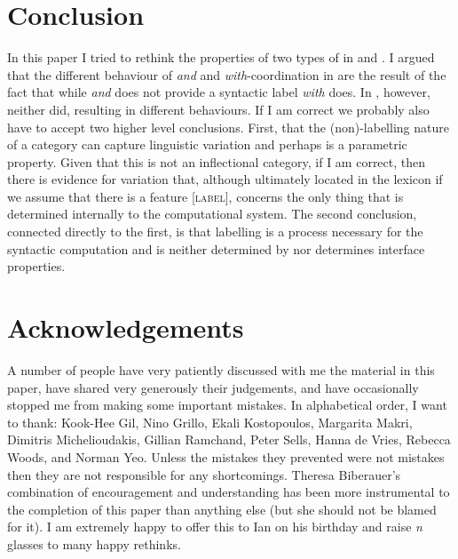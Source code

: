 \documentclass[output=paper]{langsci/langscibook}
\begin{document}
\section{Conclusion}

In this paper I tried to rethink the properties of two types of
 in  and . I argued that the
different behaviour of \emph{and} and \emph{with}-coor\-di\-na\-tion in
 are the result of the fact that while \emph{and} does not provide
a syntactic label \emph{with} does. In , however, neither did,
resulting in different behaviours. If I am correct we probably also have to
accept two higher level conclusions. First, that the (non)-labelling nature of
a category can capture linguistic variation and perhaps is a parametric
property. Given that this is not an inflectional category, if I am correct,
then there is evidence for variation that, although ultimately located in the
lexicon if we assume that there is a feature [\textsc{label}], concerns the only thing
that is determined internally to the computational system. The second
conclusion, connected directly to the first, is that labelling is a process
necessary for the syntactic computation and is neither determined by nor
determines interface properties.

\printchapterglossary{}

\section*{Acknowledgements}

A number of people have very patiently discussed with me the material in this
paper, have shared very generously their judgements, and have occasionally
stopped me from making some important mistakes. In alphabetical order, I want
to thank: Kook-Hee Gil, Nino Grillo, Ekali Kostopoulos, Margarita Makri,
Dimitris Michelioudakis, Gillian Ramchand, Peter Sells, Hanna de Vries, Rebecca
Woods, and Norman Yeo. Unless the mistakes they prevented were not mistakes
then they are not responsible for any shortcomings. Theresa Biberauer’s
combination of encouragement and understanding has been more instrumental to
the completion of this paper than anything else (but she should not be blamed
for it). I am extremely happy to offer this to Ian on his birthday and raise
\emph{n} glasses to many happy rethinks.

{\sloppy
\printbibliography[heading=subbibliography,notkeyword=this]
}
\end{document}
